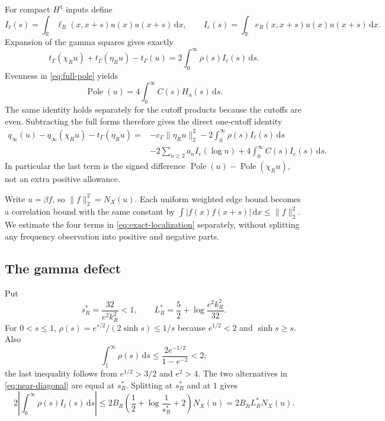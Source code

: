 \documentclass[11pt]{article}
\theoremstyle{remark}\newtheorem{remark}[theorem]{Remark}
\newcommand{\R}{\mathbb R}
\newcommand{\dd}{\,\mathrm d}
\newcommand{\norm}[1]{\lVert#1\rVert}
\newcommand{\Pole}{\operatorname{Pole}}
\numberwithin{equation}{section}
\begin{document}
For compact $H^1$ inputs define
\[
 I_\ell(s)=\int_\R\ell_R(x,x+s)u(x)u(x+s)\dd x,\qquad
 I_e(s)=\int_\R e_R(x,x+s)u(x)u(x+s)\dd x.
\]
Expansion of the gamma squares gives exactly
\begin{equation}\label{eq:gamma-localization}
 t_\Gamma(\chi_Ru)+t_\Gamma(\eta_Ru)-t_\Gamma(u)
                 =2\int_0^\infty\rho(s)I_\ell(s)\dd s.
\end{equation}
Evenness in \eqref{eq:full-pole} yields
\begin{equation}\label{eq:positive-half-pole}
 \Pole(u)=4\int_0^\infty C(s)H_u(s)\dd s.
\end{equation}
The same identity holds separately for the cutoff products because the
cutoffs are even. Subtracting the full forms therefore gives the direct
one-cutoff identity
\begin{equation}\label{eq:exact-localization}
 \begin{aligned}
 q_\infty(u)-q_\infty(\chi_Ru)-t_\Gamma(\eta_Ru)
 ={}&-c_\Gamma\norm{\eta_Ru}_2^2
       -2\int_0^\infty\rho(s)I_\ell(s)\dd s\\
    &-2\sum_{n\ge2}a_nI_e(\log n)
       +4\int_0^\infty C(s)I_e(s)\dd s.
 \end{aligned}
\end{equation}
In particular the last term is the signed difference
$\Pole(u)-\Pole(\chi_Ru)$, not an extra positive allowance.

Write $u=\beta f$, so $\norm{f}_2^2=N_X(u)$. Each uniform weighted
edge bound becomes a correlation bound with the same constant by
$\int|f(x)f(x+s)|\dd x\le\norm{f}_2^2$. We estimate the four terms
in \eqref{eq:exact-localization} separately, without splitting any
frequency observation into positive and negative parts.

\subsection{The gamma defect}
Put
\begin{equation}\label{eq:gamma-split}
 s_R^*=\frac{32}{e^2k_R^2}<1,\qquad
 L_R^*=\frac52+\log\frac{e^2k_R^2}{32}.
\end{equation}
For $0<s\le1$, $\rho(s)=e^{s/2}/(2\sinh s)\le1/s$ because
$e^{1/2}<2$ and $\sinh s\ge s$. Also
\[
 \int_1^\infty\rho(s)\dd s
 \le\frac{2e^{-1/2}}{1-e^{-2}}<2;
\]
the last inequality follows from $e^{1/2}>3/2$ and $e^2>4$.
The two alternatives in \eqref{eq:near-diagonal} are equal at $s_R^*$.
Splitting at $s_R^*$ and at $1$ gives
\begin{equation}\label{eq:gamma-error}
 2\left|\int_0^\infty\rho(s)I_\ell(s)\dd s\right|
 \le2B_R\left(\frac12+\log\frac1{s_R^*}+2\right)N_X(u)
 =2B_RL_R^*N_X(u).
\end{equation}
\end{document}
